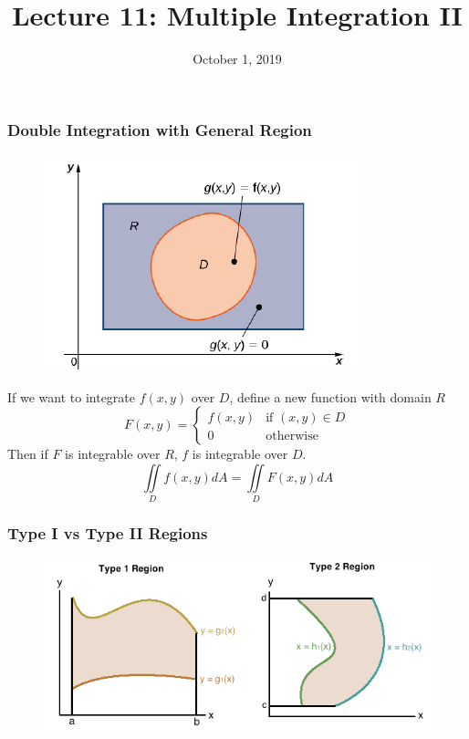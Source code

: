 \documentclass{beamer}
\title{\textbf{Lecture 11: Multiple Integration II}}
\date{October 1, 2019}
\begin{document}
	
\frame{\titlepage}


\begin{frame}
\frametitle{\textbf{Double Integration with General Region}}
\begin{figure}
	\centering
	\includegraphics[height=.35\textheight]{DR.png}\\
	\hspace*{10pt}\hbox{}
\end{figure}
If we want to integrate $f(x,y)$ over $D$, define a new function with domain $R$
$$F(x,y) = \begin{cases}
f(x,y) & \mbox{if }(x,y)\in D\\
0 & \mbox{otherwise}
\end{cases}$$
Then if $F$ is integrable over $R$, $f$ is integrable over $D$.
$$\iint\limits_{D} f(x,y)dA = \iint\limits_{D} F(x,y)dA$$
\end{frame}

\begin{frame}
\frametitle{Type I vs Type II Regions}
\begin{figure}
	
		\includegraphics[width=.95\textwidth]{image001.png}
		\hspace*{10pt}\hbox{}
\end{figure}
\end{frame}
\end{document}
